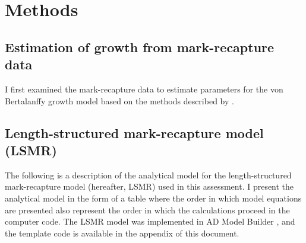 
\section{Methods}\label{sec:Methods}
\subsection{Estimation of growth from mark-recapture data}
I first examined the mark-recapture data to estimate parameters for the von Bertalanffy growth model based on the methods described by \cite{zhang2009use}.  


\subsection{Length-structured mark-recapture model (LSMR)}
The following is a description of the analytical model for the length-structured mark-recapture model (hereafter, LSMR) used in this assessment.  I present the analytical model in the form of a table where the order in which model equations are presented also represent the order in which the calculations proceed in the computer code. The LSMR model was implemented in AD Model Builder \citep{fournier2011ad}, and the template code is available in the appendix of this document.



